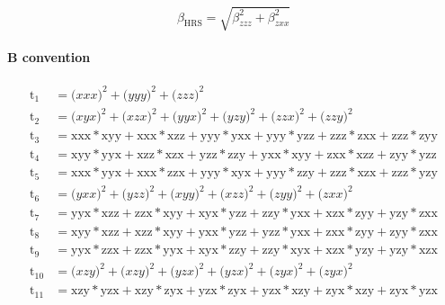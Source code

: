 \documentclass{article}
\begin{document}
	\begin{equation}\label{eq:beta_HRS2}
	\beta_{\text{HRS}}= \sqrt{\beta^{2}_{zzz}+\beta^{2}_{zxx}}
	\end{equation}
	\paragraph{B convention}
	\begin{align}\label{eq:beta_hrs_B}
	\mathrm{t_1} &= \mathrm({xxx})^{2} + \mathrm({yyy})^{2} + \mathrm({zzz})^{2}\\
	\mathrm{t_2} &= \mathrm({xyx})^{2} + \mathrm({xzx})^{2} + \mathrm({yyx})^{2} + \mathrm({yzy})^{2} + \mathrm({zzx})^{2} + \mathrm({zzy})^{2}\\
	\mathrm{t_3}&= \mathrm{xxx} * \mathrm{xyy} + \mathrm{xxx} * \mathrm{xzz} + \mathrm{yyy} * \mathrm{yxx} + \mathrm{yyy} * \mathrm{yzz} + \mathrm{zzz} * \mathrm{zxx} + \mathrm{zzz} * \mathrm{zyy} \\
	\mathrm{t_4} &= \mathrm{xyy} * \mathrm{yyx} + \mathrm{xzz} * \mathrm{xzx} + \mathrm{yzz} * \mathrm{zzy} + \mathrm{yxx} * \mathrm{xyy} + \mathrm{zxx} * \mathrm{xzz} + \mathrm{zyy} * \mathrm{yzz} \\
	\mathrm{t_5} &= \mathrm{xxx} * \mathrm{yyx} + \mathrm{xxx} * \mathrm{zzx} + \mathrm{yyy} * \mathrm{xyx} + \mathrm{yyy} * \mathrm{zzy} + \mathrm{zzz} * \mathrm{xzx} + \mathrm{zzz} * \mathrm{yzy}\\
	\mathrm{t_6} &= \mathrm({yxx})^{2} + \mathrm({yzz})^{2} + \mathrm({xyy})^{2} + \mathrm({xzz})^{2} + \mathrm({zyy})^{2} + \mathrm({zxx})^{2} \\
	\mathrm{t_7} &= \mathrm{yyx} * \mathrm{xzz} + \mathrm{zzx} * \mathrm{xyy} + \mathrm{xyx} * \mathrm{yzz} + \mathrm{zzy} * \mathrm{yxx} + \mathrm{xzx} * \mathrm{zyy} + \mathrm{yzy} * \mathrm{zxx}\\
	\mathrm{t_8} &= \mathrm{xyy} * \mathrm{xzz} + \mathrm{xzz} * \mathrm{xyy} + \mathrm{yxx} * \mathrm{yzz} + \mathrm{yzz} * \mathrm{yxx} + \mathrm{zxx} * \mathrm{zyy} + \mathrm{zyy} * \mathrm{zxx}\\
	\mathrm{t_9} &= \mathrm{yyx} * \mathrm{zzx} + \mathrm{zzx} * \mathrm{yyx} + \mathrm{xyx} * \mathrm{zzy} + \mathrm{zzy} * \mathrm{xyx} + \mathrm{xzx} * \mathrm{yzy} + \mathrm{yzy} * \mathrm{xzx} \\
	\mathrm{t_{10}} &= \mathrm({xzy})^{2} + \mathrm({xzy})^{2} + \mathrm({yzx})^{2} + \mathrm({yzx})^{2} + \mathrm({zyx})^{2} + \mathrm({zyx})^{2} \\
	\mathrm{t_{11}} &= \mathrm{xzy} * \mathrm{yzx} + \mathrm{xzy} * \mathrm{zyx} + \mathrm{yzx} * \mathrm{zyx} + \mathrm{yzx} * \mathrm{xzy} + \mathrm{zyx} * \mathrm{xzy} + \mathrm{zyx} * \mathrm{yzx} \\

\end{align}
\end{document}

